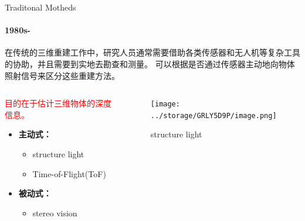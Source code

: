 \documentclass[dark]{sintefbeamer}
\begin{document}
\begin{frame}[fragile]{Traditonal Motheds}{\thesection \, \secname}
  \framesubtitle{1980s-}

  在传统的三维重建工作中，研究人员通常需要借助各类传感器和无人机等复杂工具的协助，并且需要到实地去勘查和测量。
  可以根据是否通过传感器主动地向物体照射信号来区分这些重建方法。

  \begin{columns}
    \begin{column}{0.6\textwidth}
      \textcolor{red}{目的在于估计三维物体的深度信息。}
      \begin{itemize}
        \item \textbf{主动式：}
          \begin{itemize}
            \item structure light\cite{gengStructuredlight3DSurface2011}
            \item Time-of-Flight(ToF)
          \end{itemize}
          
        \item \textbf{被动式：}
          \begin{itemize}
            \item stereo vision\cite{hamzahLiteratureSurveyStereo2016}
          \end{itemize}
      \end{itemize}
    \end{column}
    \begin{column}{0.4\textwidth}
      \begin{figure}
        \texttt{[image: ../storage/GRLY5D9P/image.png]}
        \caption{structure light}
      \end{figure}
      
    \end{column}
  \end{columns}

\end{frame}
\end{document}
